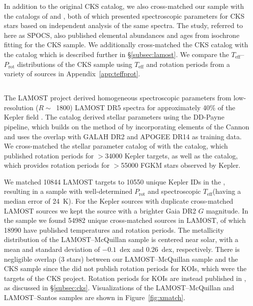 \documentclass[trackchanges,twocolumn]{aastex631}
\newcommand{\lamostmcq}{LAMOST--McQuillan\xspace}
\newcommand{\lamostsan}{LAMOST--Santos\xspace}
\newcommand{\teff}{\ensuremath{T_{\mathrm{eff}}}\xspace}
\newcommand{\prot}{\ensuremath{P_\mathrm{rot}}\xspace}
\begin{document}
In addition to the original CKS catalog, we also cross-matched our sample with the catalogs of \citet{Brewer2018} and \citet{Martinez2019}, both of which presented spectroscopic parameters for CKS stars based on independent analysis of the same spectra. The \citet{Brewer2018} study, referred to here as SPOCS, also published elemental abundances and ages from isochrone fitting for the CKS sample. We additionally cross-matched the CKS catalog with the  catalog \citep{Xiang2019} which is described further in \S\ref{subsec:lamost}. We compare the \teff--\prot distributions of the CKS sample using \teff and rotation periods from a variety of sources in Appendix~\ref{app:teffprot}.

\subsection{ \label{subsec:lamost}}
The LAMOST project derived homogeneous spectroscopic parameters from low-resolution ($R\sim$~1800) LAMOST DR5 spectra for approximately 40\% of the Kepler field \citep{Zong2018, Xiang2019}. The \citet{Xiang2019} catalog derived stellar parameters using the DD-Payne pipeline, which builds on the method of \citet{Ting2017b} by incorporating elements of the Cannon \citep{Ness2015} and uses the overlap with GALAH DR2 and APOGEE DR14 as training data. We cross-matched the  stellar parameter catalog of \citet{Xiang2019} with the \citet{McQuillan2014} catalog, which published rotation periods for $>$34000 Kepler targets, as well as the \citet{Santos2021} catalog, which provides rotation periods for $>$55000 FGKM stars observed by Kepler.

We matched 10844 LAMOST targets to 10550 unique Kepler IDs in the \citet{McQuillan2014}, resulting in a sample with well-determined \prot and spectroscopic \teff (having a median error of 24~K). For the Kepler sources with duplicate cross-matched LAMOST sources we kept the source with a brighter Gaia DR2 $G$ magnitude. In the \citet{Santos2021} sample we found 54982 unique cross-matched sources in LAMOST, of which 18990 have published temperatures and rotation periods. The metallicity distribution of the LAMOST--McQuillan sample is centered near solar, with a mean and standard deviation of $-0.1$~dex and 0.26~dex, respectively. There is negligible overlap (3 stars) between our LAMOST--McQuillan sample and the CKS sample since the \citet{McQuillan2014} did not publish rotation periods for KOIs, which were the targets of the CKS project. Rotation periods for KOIs are instead published in \citet{McQuillan2013}, as discussed in \S\ref{subsec:cks}. Visualizations of the \lamostmcq and \lamostsan samples are shown in Figure~\ref{fig:xmatch}.
\end{document}
